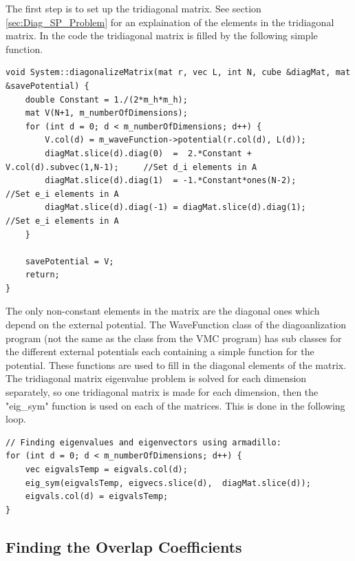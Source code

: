 \documentclass[../main.tex]{subfiles}
\begin{document}
The first step is to set up the tridiagonal matrix. See section \ref{sec:Diag_SP_Problem} for an explaination of the elements in the tridiagonal matrix. In the code the tridiagonal matrix is filled by the following simple function.
\lstset{language=c++}
\begin{lstlisting}[caption={}]
void System::diagonalizeMatrix(mat r, vec L, int N, cube &diagMat, mat &savePotential) {
    double Constant = 1./(2*m_h*m_h);
    mat V(N+1, m_numberOfDimensions);
    for (int d = 0; d < m_numberOfDimensions; d++) {
        V.col(d) = m_waveFunction->potential(r.col(d), L(d));
        diagMat.slice(d).diag(0)  =  2.*Constant + V.col(d).subvec(1,N-1);     //Set d_i elements in A
        diagMat.slice(d).diag(1)  = -1.*Constant*ones(N-2);               //Set e_i elements in A
        diagMat.slice(d).diag(-1) = diagMat.slice(d).diag(1);                         //Set e_i elements in A
    }

    savePotential = V;
    return;
}
\end{lstlisting}
The only non-constant elements in the matrix are the diagonal ones which depend on the external potential. The WaveFunction class of the diagoanlization program (not the same as the class from the VMC program) has sub classes for the different external potentials each containing a simple function for the potential. These functions are used to fill in the diagonal elements of the matrix. The tridiagonal matrix eigenvalue problem is solved for each dimension separately, so one tridiagonal matrix is made for each dimension, then the "eig\_sym" function is used on each of the matrices. This is done in the following loop.
\lstset{language=c++}
\begin{lstlisting}[caption={}]
// Finding eigenvalues and eigenvectors using armadillo:
for (int d = 0; d < m_numberOfDimensions; d++) {
    vec eigvalsTemp = eigvals.col(d);
    eig_sym(eigvalsTemp, eigvecs.slice(d),  diagMat.slice(d));
    eigvals.col(d) = eigvalsTemp;
}
\end{lstlisting}

\subsection{Finding the Overlap Coefficients}
\end{document}
